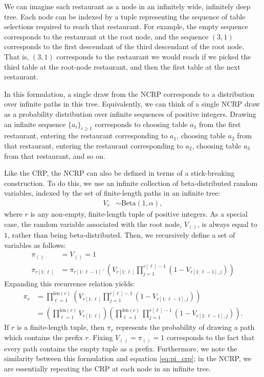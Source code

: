 \documentclass{article}
\newcommand{\len}{\text{len}}
\begin{document}
We can imagine each restaurant as a node in an infinitely wide, infinitely deep tree.
Each node can be indexed by a tuple representing the sequence of table selections required to reach that restaurant.
For example, the empty sequence corresponds to the restaurant at the root node, and the sequence $(3, 1)$ corresponds to the first descendant of the third descendant of the root node.
That is, $(3, 1)$ corresponds to the restaurant we would reach if we picked the third table at the root-node restaurant, and then the first table at the next restaurant.

In this formulation, a single draw from the NCRP corresponds to a distribution over infinite paths in this tree.
Equivalently, we can think of a single NCRP draw as a probability distribution over infinite sequences of positive integers.
Drawing an infinite sequence $\{a_i\}_{i \geq 1}$ corresponds to choosing table $a_1$ from the first restaurant, entering the restaurant corresponding to $a_1$, choosing table $a_2$ from that restaurant, entering the restaurant corresponding to $a_2$, choosing table $a_3$ from that restaurant, and so on.

Like the CRP, the NCRP can also be defined in terms of a stick-breaking construction.
To do this, we use an infinite collection of beta-distributed random variables, indexed by the set of finite-length paths in an infinite tree:
\begin{align}
V_r &\sim \text{Beta}(1, \alpha),
\end{align}
where $r$ is any non-empty, finite-length tuple of positive integers.
As a special case, the random variable associated with the root node, $V_{()}$, is always equal to $1$, rather than being beta-distributed.
Then, we recursively define a set of variables as follows:
\begin{align}
\pi_{()} &= V_{()} = 1 \\
\pi_{r[1:\ell]} &= \pi_{r[1:\ell-1]} \cdot \left( V_{r[1:\ell]} \prod_{j=1}^{r[\ell]-1} (1-V_{r[1:\ell-1],j}) \right)
\end{align}
Expanding this recurrence relation yields:
\begin{align}
\pi_r
&= \prod_{\ell = 1}^{\len(r)} \left( V_{r[1:\ell]} \prod_{j=1}^{r[\ell]-1} \left( 1 - V_{r[1:\ell-1],j} \right) \right) \\
&= \left( \prod_{\ell = 1}^{\len(r)} V_{r[1:\ell]} \right) \left( \prod_{\ell = 1}^{\len(r)} \prod_{j=1}^{r[\ell]-1} \left( 1 - V_{r[1:\ell-1],j} \right) \right).
\end{align}
If $r$ is a finite-length tuple, then $\pi_r$ represents the probability of drawing a path which contains the prefix $r$.
Fixing $V_{()} = \pi_{()} = 1$ corresponds to the fact that every path contains the empty tuple as a prefix.
Furthermore, we note the similarity between this formulation and equation \eqref{eq:pi_crp}; in the NCRP, we are essentially repeating the CRP at each node in an infinite tree.
\end{document}
